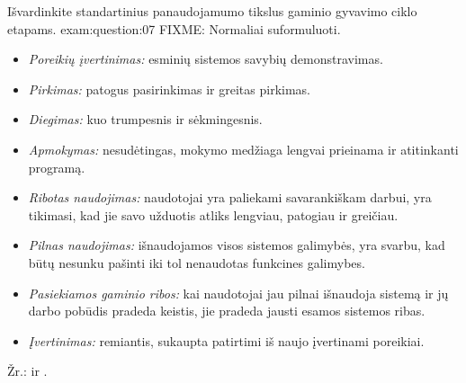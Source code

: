\begin{question}{%
  Išvardinkite standartinius panaudojamumo tikslus gaminio gyvavimo ciklo
  etapams.
  }{exam:question:07}
  FIXME: Normaliai suformuluoti.
  \begin{itemize}
    \item \emph{Poreikių įvertinimas:} esminių sistemos savybių
      demonstravimas.
    \item \emph{Pirkimas:} patogus pasirinkimas ir greitas pirkimas.
    \item \emph{Diegimas:} kuo trumpesnis ir sėkmingesnis.
    \item \emph{Apmokymas:} nesudėtingas, mokymo medžiaga lengvai prieinama
      ir atitinkanti programą.
    \item \emph{Ribotas naudojimas:} naudotojai yra paliekami savarankiškam
      darbui, yra tikimasi, kad jie savo užduotis atliks lengviau,
      patogiau ir greičiau.
    \item \emph{Pilnas naudojimas:} išnaudojamos visos sistemos galimybės,
      yra svarbu, kad būtų nesunku pašinti iki tol nenaudotas funkcines
      galimybes.
    \item \emph{Pasiekiamos gaminio ribos:} kai naudotojai jau pilnai
      išnaudoja sistemą ir jų darbo pobūdis pradeda keistis, jie
      pradeda jausti esamos sistemos ribas.
    \item \emph{Įvertinimas:} remiantis, sukaupta patirtimi iš naujo
      įvertinami poreikiai.
  \end{itemize}
  Žr.: \cite[47--49]{konspektas} ir \cite[6]{skaidres-4}.
\end{question}

